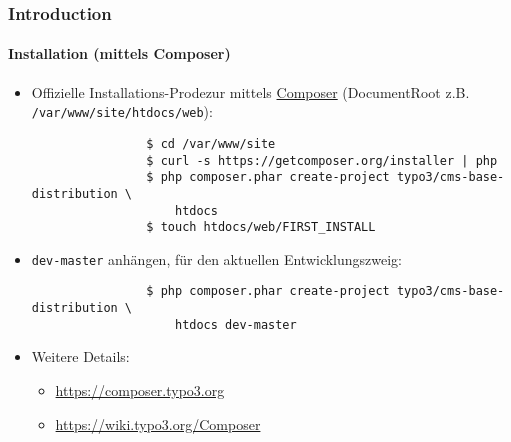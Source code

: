 \begin{frame}[fragile]
	\frametitle{Introduction}
	\framesubtitle{Installation (mittels Composer)}

	\begin{itemize}

		\item Offizielle Installations-Prodezur mittels \href{https://getcomposer.org/}{Composer}\newline
			(DocumentRoot z.B. \texttt{/var/www/site/htdocs/web}):

			\begin{lstlisting}
				$ cd /var/www/site
				$ curl -s https://getcomposer.org/installer | php
				$ php composer.phar create-project typo3/cms-base-distribution \
				    htdocs
				$ touch htdocs/web/FIRST_INSTALL
			\end{lstlisting}

		\item \texttt{dev-master} anhängen, für den aktuellen Entwicklungszweig:

			\begin{lstlisting}
				$ php composer.phar create-project typo3/cms-base-distribution \
				    htdocs dev-master
			\end{lstlisting}

		\item Weitere Details:

			\begin{itemize}
				\item \url{https://composer.typo3.org}
				\item \url{https://wiki.typo3.org/Composer}
			\end{itemize}

	\end{itemize}

\end{frame}

